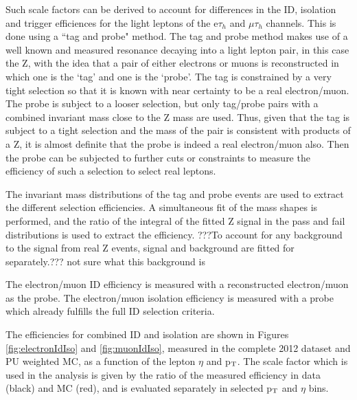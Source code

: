 Such scale factors can be derived to account for differences in the ID, isolation and trigger
efficiences for the light leptons of the e$\tau_{h}$ and $\mu\tau_{h}$ channels.
This is done using a ``tag and probe" method.
The tag and probe method makes use of a well known and measured resonance decaying
into a light lepton pair, in this case
the Z, with the idea that a pair of either electrons or muons is
reconstructed in which one
is the `tag' and one is the `probe'. The tag is constrained by a very tight
selection so that it is known with near certainty to be a real electron/muon.
The probe is subject to a looser selection, but only tag/probe pairs with a
combined invariant mass close to the Z mass are used. Thus, given that the tag
is subject to a tight selection and the mass of the pair is consistent with
products of a Z, it is almost definite that the probe is indeed a real
electron/muon also. Then the probe can be subjected to further cuts or
constraints to measure the efficiency of such a selection to select real
leptons.

The invariant mass distributions of the tag and probe events are used to extract
the different
selection efficiencies. A simultaneous fit of the mass shapes is performed, and
the ratio of the integral of the fitted Z signal in the pass and fail
distributions is used to extract the efficiency. ???To account for any background
to the signal from real Z events, signal and background are fitted for
separately.??? not sure what this background is

The electron/muon ID efficiency is measured with a reconstructed
electron/muon as the probe. The electron/muon isolation efficiency is measured
with a probe which already fulfills the full ID selection criteria. 

The efficiencies for combined ID and isolation are shown in Figures
\ref{fig:electronIdIso} and \ref{fig:muonIdIso}, measured in the complete 2012
dataset and PU weighted MC, as a function of the lepton $\eta$ and p$_{\rm{T}}$.
The scale factor which is used in the analysis is given by the ratio of the
measured efficiency in data (black) and MC (red), and is evaluated separately in
selected p$_{\rm{T}}$ and $\eta$ bins.


